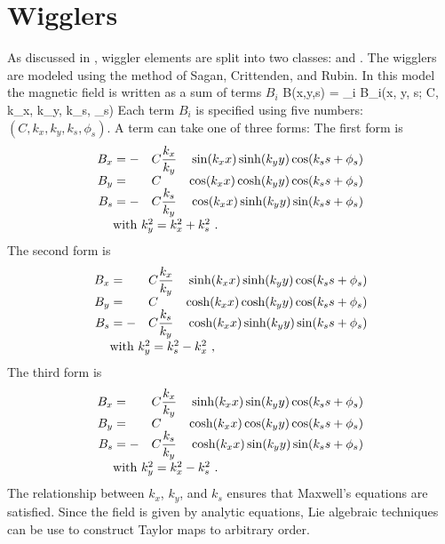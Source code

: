 \section{Wigglers}
\label{s:wiggler.phys}

As discussed in , \bmad wiggler elements are
split into two classes:  and . The 
 wigglers are modeled using the method of Sagan, Crittenden,
and Rubin\cite{b:wiggler}. In this model the magnetic field is written
as a sum of terms $B_i$
\Begineq
  B(x,y,s) = \sum_i B_i(x, y, s; C, k_x, k_y, k_s, \phi_s)
\Endeq 
Each term $B_i$ is specified using five numbers: 
$(C, k_x, k_y, k_s, \phi_s)$. A term can take one of three forms: The first
form is
\begin{alignat}{4}
  B_x &= -&C &\dfrac{k_x}{k_y} & \sin(\kxx) \sinh(\kyy) \cos(\ksss) \CRNEG
  B_y &=  &C &                 & \cos(\kxx) \cosh(\kyy) \cos(\ksss) \CRNEG
  B_s &= -&C &\dfrac{k_s}{k_y} & \cos(\kxx) \sinh(\kyy) \sin(\ksss) \CRneg
  & \makebox[1pt][l]{with $k_y^2 = k_x^2 + k_s^2$ .} &&&  \label{f1}
\end{alignat}
The second form is
\begin{alignat}{4}
  B_x &=  &C &\dfrac{k_x}{k_y} & \sinh(\kxx) \sinh(\kyy) \cos(\ksss) \CRNEG
  B_y &=  &C &                 & \cosh(\kxx) \cosh(\kyy) \cos(\ksss) \CRNEG
  B_s &= -&C &\dfrac{k_s}{k_y} & \cosh(\kxx) \sinh(\kyy) \sin(\ksss) \CRneg
  & \makebox[1pt][l]{with $k_y^2 = k_s^2 - k_x^2$ ,} &&&  \label{f2}
\end{alignat}
The third form is
\begin{alignat}{4}
  B_x &=  &C &\dfrac{k_x}{k_y} & \sinh(\kxx) \sin(\kyy) \cos(\ksss) \CRNEG
  B_y &=  &C &                 & \cosh(\kxx) \cos(\kyy) \cos(\ksss) \CRNEG
  B_s &= -&C &\dfrac{k_s}{k_y} & \cosh(\kxx) \sin(\kyy) \sin(\ksss) \CRneg
  & \makebox[1pt][l]{with $k_y^2 = k_x^2 - k_s^2$ .} &&& \label{f3}
\end{alignat}
The relationship between $k_x$, $k_y$, and $k_s$ ensures that
Maxwell's equations are satisfied. Since the field is given by
analytic equations, Lie algebraic techniques can be use to construct
Taylor maps to arbitrary order.

